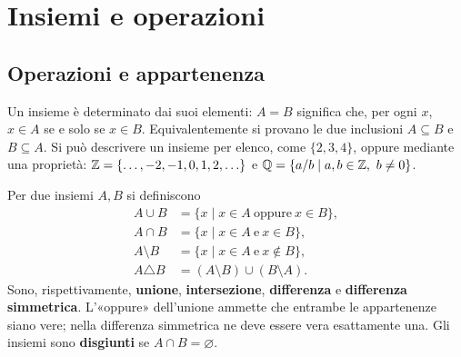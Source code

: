 \chapter{Insiemi e operazioni}

\section{Operazioni e appartenenza}
Un insieme è determinato dai suoi elementi: $A=B$ significa che, per ogni $x$, $x\in A$ se e solo se $x\in B$. Equivalentemente si provano le due inclusioni $A\subseteq B$ e $B\subseteq A$. Si può descrivere un insieme per elenco, come $\{2,3,4\}$, oppure mediante una proprietà: $\mathbb{Z}=\{\ldots,-2,-1,0,1,2,\ldots\}$ e $\mathbb{Q}=\{a/b\mid a,b\in\mathbb{Z},\ b\ne0\}$.

\begin{definizione}
Per due insiemi $A,B$ si definiscono
\[
\begin{aligned}
A\cup B&=\{x\mid x\in A\ \text{oppure}\ x\in B\},\\
A\cap B&=\{x\mid x\in A\ \text{e}\ x\in B\},\\
A\setminus B&=\{x\mid x\in A\ \text{e}\ x\notin B\},\\
A\triangle B&=(A\setminus B)\cup(B\setminus A).
\end{aligned}
\]
Sono, rispettivamente, \textbf{unione}, \textbf{intersezione}, \textbf{differenza} e \textbf{differenza simmetrica}. L'«oppure» dell'unione ammette che entrambe le appartenenze siano vere; nella differenza simmetrica ne deve essere vera esattamente una. Gli insiemi sono \textbf{disgiunti} se $A\cap B=\varnothing$.
\end{definizione}

\begin{schema}
\end{schema}

